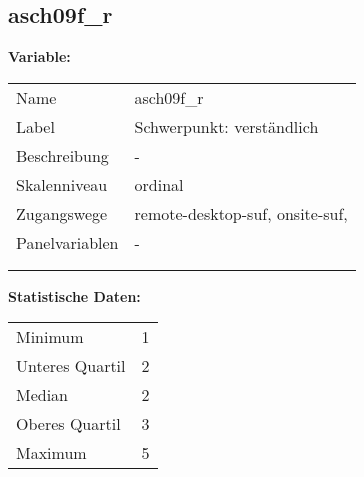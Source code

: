 	
	
	\subsection{asch09f\_r}
	\label{subSection:asch09f_r}

	\noindent\textbf{Variable:}\\
		\begin{tabular}{lL{11.3cm}}
			\label{tableVariable:asch09f_r}
			Name & asch09f\_r \\
			Label & Schwerpunkt: verständlich \\
			Beschreibung & - \\
			Skalenniveau & ordinal \\
			Zugangswege &
				remote-desktop-suf,
				onsite-suf,
 \\
			Panelvariablen & -
			 \\
			 \\
 \\
		\end{tabular}



		\vspace*{1 cm}
		\noindent\textbf{Statistische Daten:}\\
			\begin{tabular}{ll}
				\label{tableStatistics:asch09f_r}
					Minimum & 1 \\
					Unteres Quartil & 2 \\
					Median & 2 \\
					Oberes Quartil & 3 \\
					Maximum & 5 \\
			\end{tabular}



